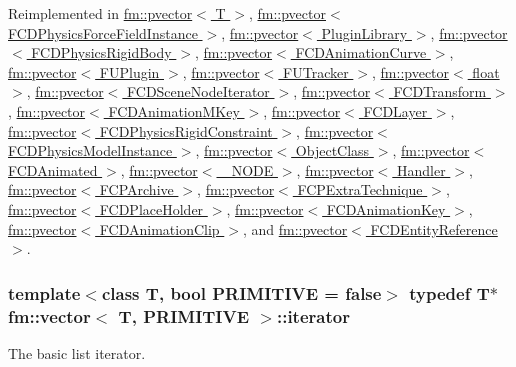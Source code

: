 Reimplemented in \hyperlink{classfm_1_1pvector_a3b3854f2e635665ad6a0d59bf841099a}{fm::pvector$<$ T $>$}, \hyperlink{classfm_1_1pvector_a3b3854f2e635665ad6a0d59bf841099a}{fm::pvector$<$ FCDPhysicsForceFieldInstance $>$}, \hyperlink{classfm_1_1pvector_a3b3854f2e635665ad6a0d59bf841099a}{fm::pvector$<$ PluginLibrary $>$}, \hyperlink{classfm_1_1pvector_a3b3854f2e635665ad6a0d59bf841099a}{fm::pvector$<$ FCDPhysicsRigidBody $>$}, \hyperlink{classfm_1_1pvector_a3b3854f2e635665ad6a0d59bf841099a}{fm::pvector$<$ FCDAnimationCurve $>$}, \hyperlink{classfm_1_1pvector_a3b3854f2e635665ad6a0d59bf841099a}{fm::pvector$<$ FUPlugin $>$}, \hyperlink{classfm_1_1pvector_a3b3854f2e635665ad6a0d59bf841099a}{fm::pvector$<$ FUTracker $>$}, \hyperlink{classfm_1_1pvector_a3b3854f2e635665ad6a0d59bf841099a}{fm::pvector$<$ float $>$}, \hyperlink{classfm_1_1pvector_a3b3854f2e635665ad6a0d59bf841099a}{fm::pvector$<$ FCDSceneNodeIterator $>$}, \hyperlink{classfm_1_1pvector_a3b3854f2e635665ad6a0d59bf841099a}{fm::pvector$<$ FCDTransform $>$}, \hyperlink{classfm_1_1pvector_a3b3854f2e635665ad6a0d59bf841099a}{fm::pvector$<$ FCDAnimationMKey $>$}, \hyperlink{classfm_1_1pvector_a3b3854f2e635665ad6a0d59bf841099a}{fm::pvector$<$ FCDLayer $>$}, \hyperlink{classfm_1_1pvector_a3b3854f2e635665ad6a0d59bf841099a}{fm::pvector$<$ FCDPhysicsRigidConstraint $>$}, \hyperlink{classfm_1_1pvector_a3b3854f2e635665ad6a0d59bf841099a}{fm::pvector$<$ FCDPhysicsModelInstance $>$}, \hyperlink{classfm_1_1pvector_a3b3854f2e635665ad6a0d59bf841099a}{fm::pvector$<$ ObjectClass $>$}, \hyperlink{classfm_1_1pvector_a3b3854f2e635665ad6a0d59bf841099a}{fm::pvector$<$ FCDAnimated $>$}, \hyperlink{classfm_1_1pvector_a3b3854f2e635665ad6a0d59bf841099a}{fm::pvector$<$ \_\-NODE $>$}, \hyperlink{classfm_1_1pvector_a3b3854f2e635665ad6a0d59bf841099a}{fm::pvector$<$ Handler $>$}, \hyperlink{classfm_1_1pvector_a3b3854f2e635665ad6a0d59bf841099a}{fm::pvector$<$ FCPArchive $>$}, \hyperlink{classfm_1_1pvector_a3b3854f2e635665ad6a0d59bf841099a}{fm::pvector$<$ FCPExtraTechnique $>$}, \hyperlink{classfm_1_1pvector_a3b3854f2e635665ad6a0d59bf841099a}{fm::pvector$<$ FCDPlaceHolder $>$}, \hyperlink{classfm_1_1pvector_a3b3854f2e635665ad6a0d59bf841099a}{fm::pvector$<$ FCDAnimationKey $>$}, \hyperlink{classfm_1_1pvector_a3b3854f2e635665ad6a0d59bf841099a}{fm::pvector$<$ FCDAnimationClip $>$}, and \hyperlink{classfm_1_1pvector_a3b3854f2e635665ad6a0d59bf841099a}{fm::pvector$<$ FCDEntityReference $>$}.

\hypertarget{classfm_1_1vector_a45a46984d2c34a4b3a21a8f8532fa213}{
\subsubsection[{iterator}]{\setlength{\rightskip}{0pt plus 5cm}template$<$class T, bool PRIMITIVE = false$>$ typedef T$\ast$ {\bf fm::vector}$<$ T, PRIMITIVE $>$::{\bf iterator}}}
\label{classfm_1_1vector_a45a46984d2c34a4b3a21a8f8532fa213}
The basic list iterator. 

